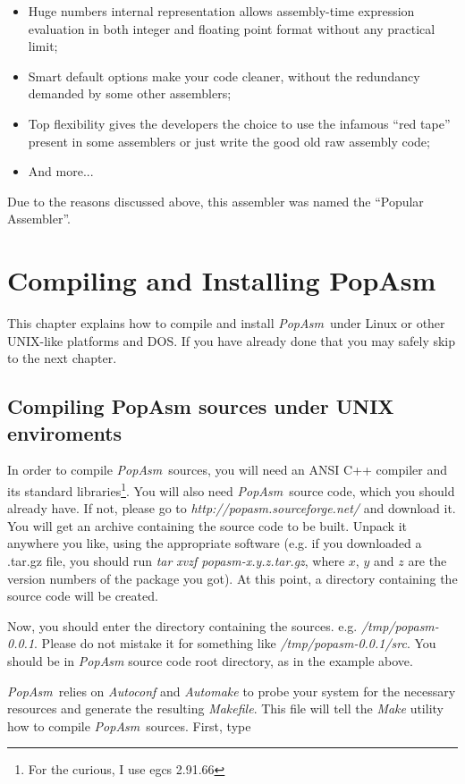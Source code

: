 \documentclass[a4paper,12pt]{book}
\newcommand{\popasm}{\emph{PopAsm}}
\begin{document}
\begin{itemize}
\item{Huge numbers internal representation} allows assembly-time
expression evaluation in both integer and floating
point format without any practical limit;
   \item{Smart default options} make your code cleaner, without the
redundancy demanded by some other assemblers;
\item{Top flexibility} gives the developers the choice to use the
infamous ``red tape'' present in some assemblers
or just write the good old raw assembly code;
\item{And more...}
\end{itemize}

Due to the reasons discussed above, this assembler was named the
``Popular Assembler''.

\chapter{Compiling and Installing PopAsm}
This chapter explains how to compile and install \popasm\ under
Linux or other UNIX-like
platforms and DOS. If you have already done that you may safely skip to
the next chapter.
                          
\section{Compiling PopAsm sources under UNIX
enviroments\label{COMPILING}}
In order to compile \popasm\ sources, you will need an ANSI C++
compiler and its standard
libraries\footnote{For the curious, I use egcs 2.91.66}. You will also
need \popasm\ source
code, which you should already have. If not, please go to
\emph{http://popasm.sourceforge.net/}
and download it. You will get an archive containing the source code to
be built. Unpack it
anywhere you like, using the appropriate software (e.g. if you
downloaded a .tar.gz file, you
should run \emph{tar xvzf popasm-x.y.z.tar.gz}, where $x$, $y$ and $z$
are the version numbers
of the package you got). At this point, a directory containing the
source code will be created.

Now, you should enter the directory containing the sources. e.g.
\emph{/tmp/popasm-0.0.1}. Please
do not mistake it for something like \emph{/tmp/popasm-0.0.1/src}. You
should be in \popasm
source code root directory, as in the example above.

\popasm\ relies on \emph{Autoconf}\cite{AUTOCONF} and
\emph{Automake}\cite{AUTOMAKE} to probe
your system for the necessary resources and generate the resulting
\emph{Makefile}. This file will
tell the \emph{Make}\cite{MAKE} utility how to compile \popasm\ sources.
First, type
\end{document}
